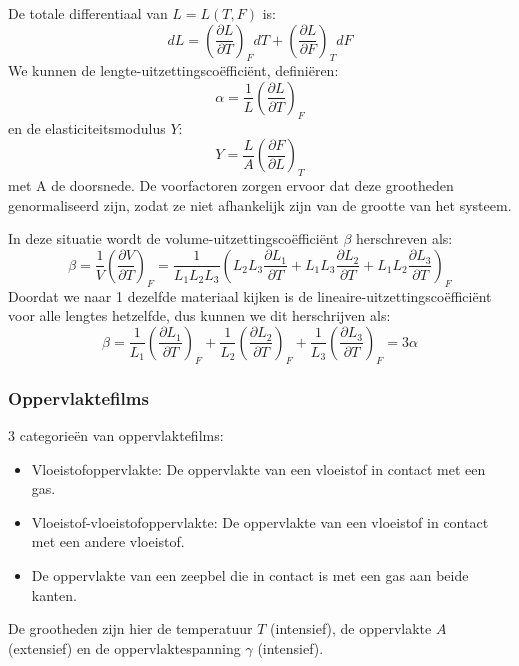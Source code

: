De totale differentiaal van \(L=L(T,F)\) is:
\[dL = \left( \frac{\partial L}{\partial T} \right)_F dT + \left( \frac{\partial L}{\partial F} \right)_T dF\]
We kunnen de lengte-uitzettingscoëfficiënt, definiëren:
\begin{equation}
    \label{eq: lengte-uitzettingscoefficient}
    \alpha = \frac{1}{L} \left( \frac{\partial L}{\partial T} \right)_F
\end{equation}
en de elasticiteitsmodulus \(Y\):
\begin{equation}
    \label{eq: elasticiteitsmodulus}
    Y =  \frac{L}{A}\left( \frac{\partial F}{\partial L} \right)_T
\end{equation}
met A de doorsnede. De voorfactoren zorgen ervoor dat deze grootheden genormaliseerd zijn, zodat ze niet afhankelijk zijn van de grootte van het systeem.

In deze situatie wordt de volume-uitzettingscoëfficiënt \(\beta\) herschreven als:
\[\beta = \frac{1}{V} \left( \frac{\partial V}{\partial T} \right)_F = \frac{1}{L_1L_2L_3} \left( L_2L_3\frac{\partial L_1}{\partial T} + L_1L_3\frac{\partial L_2}{\partial T} + L_1L_2\frac{\partial L_3}{\partial T} \right)_F \]
Doordat we naar 1 dezelfde materiaal kijken is de lineaire-uitzettingscoëfficiënt voor alle lengtes hetzelfde, dus kunnen we dit herschrijven als:
\[\beta =  \frac{1}{L_1}\left(\frac{\partial L_1}{\partial T}\right)_F + \frac{1}{L_2}\left(\frac{\partial L_2}{\partial T}\right)_F + \frac{1}{L_3}\left(\frac{\partial L_3}{\partial T}\right)_F  = 3 \alpha\]

\subsubsection{Oppervlaktefilms}

3 categorieën van oppervlaktefilms:
\begin{itemize}
    \item Vloeistofoppervlakte: De oppervlakte van een vloeistof in contact met een gas. 
    \item Vloeistof-vloeistofoppervlakte: De oppervlakte van een vloeistof in contact met een andere vloeistof.
    \item De oppervlakte van een zeepbel die in contact is met een gas aan beide kanten.
\end{itemize}   

De grootheden zijn hier de temperatuur \(T\) (intensief), de oppervlakte \(A\) (extensief) en de oppervlaktespanning \(\gamma\) (intensief).

